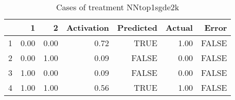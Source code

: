 \begin{table}[ht]
\centering
\begin{tabular}{rrrrrrr}
  \hline
 & 1 & 2 & Activation & Predicted & Actual & Error \\ 
  \hline
1 & 0.00 & 0.00 & 0.72 & TRUE & 1.00 & FALSE \\ 
  2 & 0.00 & 1.00 & 0.09 & FALSE & 0.00 & FALSE \\ 
  3 & 1.00 & 0.00 & 0.09 & FALSE & 0.00 & FALSE \\ 
  4 & 1.00 & 1.00 & 0.56 & TRUE & 1.00 & FALSE \\ 
   \hline
\end{tabular}
\caption{Cases of treatment NNtop1sgde2k} 
\end{table}
